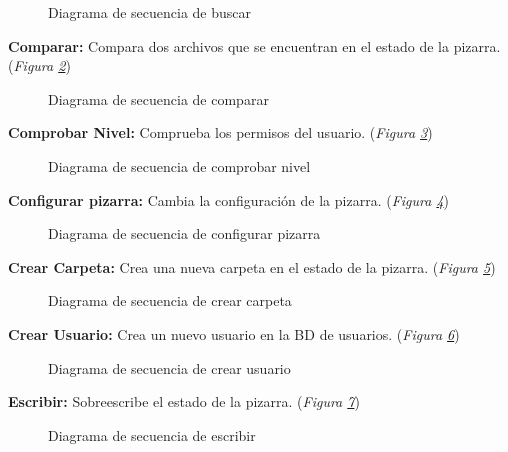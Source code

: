 \begin{figure}[H]
\centering
\seqBuscar
\caption{Diagrama de secuencia de buscar}
\label{fig:seqBuscar}
\end{figure}

\textbf{Comparar:} Compara dos archivos que se encuentran en el estado de la pizarra.(\emph{Figura \ref{fig:seqComparar}}) 

\begin{figure}[H]
\centering
\seqComparar
\caption{Diagrama de secuencia de comparar}
\label{fig:seqComparar}
\end{figure}

\textbf{Comprobar Nivel:} Comprueba los permisos del usuario. (\emph{Figura \ref{fig:seqComprobarNivel}}) 

\begin{figure}[H]
\centering
\seqComprobarNivel
\caption{Diagrama de secuencia de comprobar nivel}
\label{fig:seqComprobarNivel}
\end{figure}

\textbf{Configurar pizarra:} Cambia la configuración de la pizarra. (\emph{Figura \ref{fig:seqConfigurarPizarra}}) 

\begin{figure}[H]
\centering
\seqConfigurarPizarra
\caption{Diagrama de secuencia de configurar pizarra}
\label{fig:seqConfigurarPizarra}
\end{figure}

\textbf{Crear Carpeta:} Crea una nueva carpeta en el estado de la pizarra. (\emph{Figura \ref{fig:seqCrearCarpeta}}) 

\begin{figure}[H]
\centering
\seqCrearCarpeta
\caption{Diagrama de secuencia de crear carpeta}
\label{fig:seqCrearCarpeta}
\end{figure}

\textbf{Crear Usuario:} Crea un nuevo usuario en la BD de usuarios. (\emph{Figura \ref{fig:seqcrearusuario}}) 

\begin{figure}[H]
\centering
\seqCrearUsuario
\caption{Diagrama de secuencia de crear usuario}
\label{fig:seqcrearusuario}
\end{figure}

\textbf{Escribir:} Sobreescribe el estado de la pizarra. (\emph{Figura \ref{fig:seqEscribir}}) 

\begin{figure}[H]
\centering
\seqEscribir
\caption{Diagrama de secuencia de escribir}
\label{fig:seqEscribir}
\end{figure}

